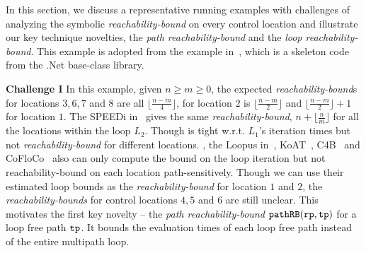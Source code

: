 In this section, we discuss a representative running examples with
challenges of analyzing the symbolic
\emph{reachability-bound} on
every control location and illustrate our key technique novelties, the \emph{path reachability-bound} and the \emph{loop reachability-bound}.
This example is adopted from the example in~\cite{GulwaniZ10}, which
is a skeleton code from the .Net base-class library.


\textbf{Challenge I}
  In this example, given $n \geq m \geq 0$,
the expected \emph{reachability-bound}s for locations $3, 6, 7$ and $8$ are all $ \lfloor\frac{n-m}{4}\rfloor$,
for location $2$ is $\lfloor\frac{n-m}{2}\rfloor$ and  $\lfloor\frac{n-m}{2}\rfloor + 1$ for location $1$.
The SPEEDi in~\cite{GulwaniZ10}
gives the same \emph{reachability-bound}, $n + \lfloor\frac{n}{m}\rfloor$ for all the locations within the loop $L_2$. Though is tight w.r.t. $L_1$'s iteration times but not \emph{reachability-bound} for different locations.
\cite{GulwaniJK09}, the Loopus in~\cite{SinnZV17}, KoAT~\cite{BrockschmidtEFFG14,FalkeKS12,FalkeKS11}, C4B~\cite{CarbonneauxHS15} and CoFloCo~\cite{Montoya17,Flores-Montoya16,Flores-MontoyaH14} also can only compute the bound on the loop iteration but not reachability-bound on each location path-sensitively.
Though we can use their estimated loop bounds as the \emph{reachability-bound} for location $1$ and $2$,
the \emph{reachability-bounds} for control locations $4, 5$ and $6$ are still unclear.
%
This motivates the first key novelty -- the \emph{path reachability-bound} $\mathtt{pathRB}(\mathtt{rp}, \mathtt{tp})$ for a loop free path $\mathtt{tp}$.
It bounds the evaluation times of each loop free path instead of the entire multipath loop.

